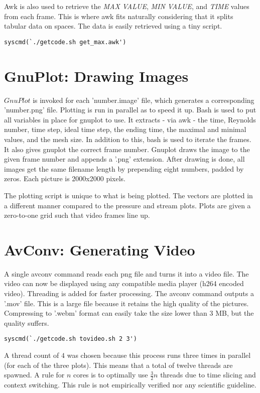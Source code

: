 \documentclass[listof=totoc]{report}
\begin{document}
Awk is also used to retrieve the \emph{MAX VALUE}, \emph{MIN VALUE}, and \emph{TIME} values from each frame. This is where awk fits naturally considering that it splits tabular data on spaces. The data is easily retrieved using a tiny script.

\begin{verbatim}
syscmd(`./getcode.sh get_max.awk')
\end{verbatim}


\section{GnuPlot: Drawing Images}
$GnuPlot$ is invoked for each 'number.image' file, which generates a corresponding 'number.png' file. Plotting is run in parallel as to speed it up. Bash is used to put all variables in place for gnuplot to use. It extracts - via awk - the time, Reynolds number, time step, ideal time step, the ending time, the maximal and minimal values, and the mesh size. In addition to this, bash is used to iterate the frames. It also gives gnuplot the correct frame number. Gnuplot draws the image to the given frame number and appends a '.png' extension. After drawing is done, all images get the same filename length by prepending eight numbers, padded by zeros. Each picture is 2000x2000 pixels.

The plotting script is unique to what is being plotted. The vectors are plotted in a different manner compared to the pressure and stream plots. Plots are given a zero-to-one grid such that video frames line up.

\section{AvConv: Generating Video}
A single avconv command reads each png file and turns it into a video file. The video can now be displayed using any compatible media player (h264 encoded video). Threading is added for faster processing. The avconv command outputs a '.mov' file. This is a large file because it retains the high quality of the pictures. Compressing to '.webm' format can easily take the size lower than 3 MB, but the quality suffers.

\begin{verbatim}
syscmd(`./getcode.sh tovideo.sh 2 3')
\end{verbatim}

A thread count of $4$ was chosen because this process runs three times in parallel (for each of the three plots). This means that a total of twelve threads are spawned. A rule for $n$ cores is to optimally use $\frac{3}{2} n$ threads due to time slicing and context switching. This rule is not empirically verified nor any scientific guideline.
\end{document}
